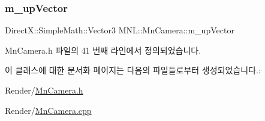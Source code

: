 \subsubsection{\texorpdfstring{m\+\_\+up\+Vector}{m\_upVector}}
{\footnotesize\ttfamily Direct\+X\+::\+Simple\+Math\+::\+Vector3 M\+N\+L\+::\+Mn\+Camera\+::m\+\_\+up\+Vector\hspace{0.3cm}{\ttfamily [private]}}



Mn\+Camera.\+h 파일의 41 번째 라인에서 정의되었습니다.



이 클래스에 대한 문서화 페이지는 다음의 파일들로부터 생성되었습니다.\+:\begin{DoxyCompactItemize}
\item 
Render/\hyperlink{_mn_camera_8h}{Mn\+Camera.\+h}\item 
Render/\hyperlink{_mn_camera_8cpp}{Mn\+Camera.\+cpp}\end{DoxyCompactItemize}
